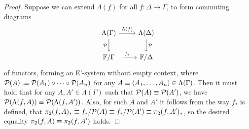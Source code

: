 \begin{proof}
Suppose we can extend $\Lambda(f)$ for all $f:\Delta\to\Gamma$, to form commuting
diagrams
\begin{equation*}
\begin{tikzcd}
\Lambda(\Gamma) \arrow[d,swap,"\mathcal{P}"] \arrow[r,"\Lambda(f)"] & \Lambda(\Delta) \arrow[d,"\mathcal{P}"] \\
\cat{F}/\Gamma \arrow[r,densely dotted,"{f_\ast}"] & \cat{F}/\Delta
\end{tikzcd}
\end{equation*}
of functors, forming an E'-system without empty context, where $\mathcal{P}(A)
\vcentcolon\equiv \mathcal{P}(A_1)\circ\cdots\circ\mathcal{P}(A_n)$ for any
$A\equiv (A_1,\ldots,A_n)\in\Lambda(\Gamma)$. Then it must hold that for any
$A,A'\in\Lambda(\Gamma)$ such that $\mathcal{P}(A)\equiv\mathcal{P}(A')$, we have
$\mathcal{P}(\Lambda(f,A))\equiv\mathcal{P}(\Lambda(f,A'))$. Also, for such
$A$ and $A'$ it follows from the way $f_\ast$ is defined, 
that $\pi_2(f,A)_\ast\equiv f_\ast/\mathcal{P}(A)\equiv
f_\ast/\mathcal{P}(A')\equiv\pi_2(f,A')_\ast$, so the desired equality
$\pi_2(f,A)\equiv\pi_2(f,A')$ holds.


\end{proof}
